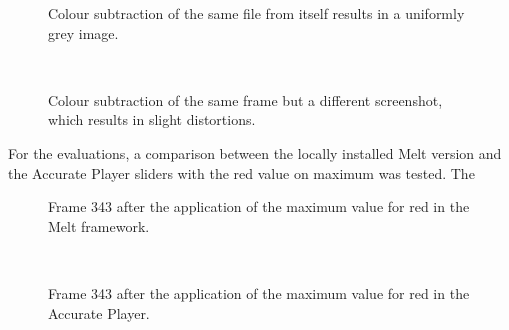 \documentclass[../MasterThesis.tex]{subfiles}
\begin{document}
\begin{minipage}{0.48\textwidth}
	
	\begin{figure}[H]
		\begin{center}
			\label{figure:greyresult_unit}
			\caption[Colour subtraction of the same file from itself.]{Colour subtraction of the same file from itself results in a uniformly grey image.}
		\end{center}
	\end{figure}
\end{minipage}\begin{minipage}{0.04\textwidth}
	\ 
\end{minipage}\begin{minipage}{0.48\textwidth}
	
	\begin{figure}[H]
		\begin{center}
			\label{figure:greyresult_blurry}
			\caption[Colour subtraction of the same frame but a different screenshot.]{Colour subtraction of the same frame but a different screenshot, which results in slight distortions.}
		\end{center}
	\end{figure}
\end{minipage}

For the evaluations, a comparison between the locally installed Melt version and the Accurate Player sliders with the red value on maximum was tested. The 


\begin{minipage}{0.48\textwidth}
	
	\begin{figure}[H]
		\begin{center}
			\label{figure:redMelt}
			\caption[Frame 343 after the application of the maximum value for red in the Melt framework.]{Frame 343 after the application of the maximum value for red in the Melt framework.}
		\end{center}
	\end{figure}
\end{minipage}\begin{minipage}{0.04\textwidth}
	\ 
\end{minipage}\begin{minipage}{0.48\textwidth}
	
	\begin{figure}[H]
		\begin{center}
			\label{figure:redAP}
			\caption[Frame 343 after the application of the maximum value for red in the Accurate Player.]{Frame 343 after the application of the maximum value for red in the Accurate Player.}
		\end{center}
	\end{figure}
\end{minipage}
\end{document}
